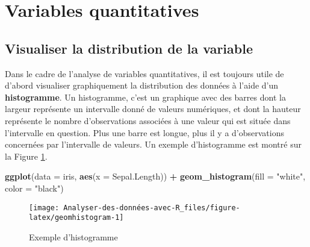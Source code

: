 \documentclass[
  french,
]{book}
\newenvironment{Shaded}{\begin{snugshade}}{\end{snugshade}}
\newcommand{\DataTypeTok}[1]{\textcolor[rgb]{0.13,0.29,0.53}{#1}}
\newcommand{\KeywordTok}[1]{\textcolor[rgb]{0.13,0.29,0.53}{\textbf{#1}}}
\newcommand{\NormalTok}[1]{#1}
\newcommand{\OperatorTok}[1]{\textcolor[rgb]{0.81,0.36,0.00}{\textbf{#1}}}
\newcommand{\StringTok}[1]{\textcolor[rgb]{0.31,0.60,0.02}{#1}}
\begin{document}
\hypertarget{variables-quantitatives}{%
\section{Variables quantitatives}\label{variables-quantitatives}}

\hypertarget{visualiser-la-distribution-de-la-variable}{%
\subsection{Visualiser la distribution de la variable}\label{visualiser-la-distribution-de-la-variable}}

Dans le cadre de l'analyse de variables quantitatives, il est toujours utile de d'abord visualiser graphiquement la distribution des données à l'aide d'un \textbf{histogramme}. Un histogramme, c'est un graphique avec des barres dont la largeur représente un intervalle donné de valeurs numériques, et dont la hauteur représente le nombre d'observations associées à une valeur qui est située dans l'intervalle en question. Plus une barre est longue, plus il y a d'observations concernées par l'intervalle de valeurs. Un exemple d'histogramme est montré sur la Figure \ref{fig:geomhistogram}.

\begin{Shaded}
\begin{Highlighting}[]
\KeywordTok{ggplot}\NormalTok{(}\DataTypeTok{data =}\NormalTok{ iris, }\KeywordTok{aes}\NormalTok{(}\DataTypeTok{x =}\NormalTok{ Sepal.Length)) }\OperatorTok{+}\StringTok{ }
\StringTok{  }\KeywordTok{geom_histogram}\NormalTok{(}\DataTypeTok{fill =} \StringTok{"white"}\NormalTok{, }\DataTypeTok{color =} \StringTok{"black"}\NormalTok{)}
\end{Highlighting}
\end{Shaded}

\begin{figure}

{\centering \texttt{[image: Analyser-des-données-avec-R\_files/figure-latex/geomhistogram-1]} 

}

\caption{Exemple d'histogramme}\label{fig:geomhistogram}
\end{figure}
\end{document}
